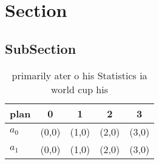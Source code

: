 \documentclass[a4paper]{article}
\begin{document}
\section{Section}

\subsection{SubSection}

\begin{table}
\begin{adjustbox}{width=0.7\columnwidth}
\begin{tabular}{|l|l|l|l|l|}
\hline
\textbf{plan} & \multicolumn{1}{c|}{\textbf{0}} & \multicolumn{1}{c|}{\textbf{1}} & \multicolumn{1}{c|}{\textbf{2}} & \multicolumn{1}{c|}{\textbf{3}} \\ \hline
\textbf{$a_0$}  & (0,0) & (1,0) & (2,0) & (3,0) \\ \hline
\textbf{$a_1$}  & (0,0) & (1,0) & (2,0) & (3,0) \\ \hline
\end{tabular}
\end{adjustbox}
\caption{ primarily ater o his Statistics ia world cup his
}
\end{table}
\end{document}
